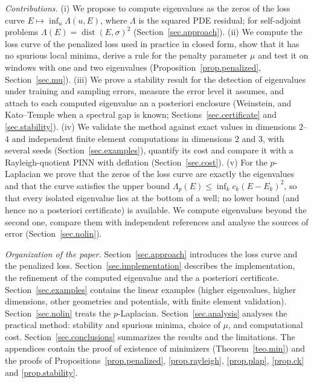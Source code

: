 \documentclass[10pt]{amsart}
\newenvironment{revblock}{\color{blue}}{}
\theoremstyle{definition}
\theoremstyle{remark}
\theoremstyle{plain}
\DeclareMathOperator{\dist}{dist}
\begin{document}
\begin{revblock}
\noindent\emph{Contributions.} (i) We propose to compute eigenvalues as the zeros of the loss curve
$E\mapsto\inf_u\Lambda(u,E)$, where $\Lambda$ is the squared PDE residual; for self-adjoint
problems $\Lambda(E)=\dist(E,\sigma)^2$ (Section~\ref{sec.approach}). (ii) We compute the loss curve
of the penalized loss used in practice in closed form, show that it has no spurious local minima,
derive a rule for the penalty parameter $\mu$ and test it on windows with one and two eigenvalues
(Proposition~\ref{prop.penalized}, Section~\ref{sec.mu}). (iii) We prove a stability result for the
detection of eigenvalues under training and sampling errors, measure the error level it assumes,
and attach to each computed eigenvalue an a posteriori enclosure (Weinstein, and Kato--Temple when
a spectral gap is known;
Sections~\ref{sec.certificate} and \ref{sec.stability}). (iv) We validate the method against exact
values in dimensions $2$--$4$ and independent finite element computations in dimensions $2$ and
$3$, with several seeds
(Section~\ref{sec.examples}), quantify its cost and compare it with a Rayleigh-quotient PINN with
deflation (Section~\ref{sec.cost}). (v) For the $p$-Laplacian we prove that the zeros of the loss
curve are exactly the eigenvalues and that the curve satisfies the upper bound
$\Lambda_p(E)\le\inf_kc_k(E-E_k)^2$, so that every isolated eigenvalue lies at the bottom of a well; no lower
bound (and hence no a posteriori certificate) is available. We compute eigenvalues beyond the second
one, compare them with independent references and analyse the sources of error
(Section~\ref{sec.nolin}).

\noindent\emph{Organization of the paper.} Section~\ref{sec.approach} introduces the loss curve and
the penalized loss. Section~\ref{sec.implementation} describes the implementation, the refinement
of the computed eigenvalue and the a posteriori certificate. Section~\ref{sec.examples} contains
the linear examples (higher eigenvalues, higher dimensions, other geometries and potentials, with
finite element validation). Section~\ref{sec.nolin} treats the $p$-Laplacian. Section~\ref{sec.analysis}
analyses the practical method: stability and spurious minima, choice of $\mu$, and computational
cost. Section~\ref{sec.conclusions} summarizes the results and the limitations. The appendices
contain the proof of existence of minimizers (Theorem~\ref{teo.min}) and the proofs of
Propositions~\ref{prop.penalized}, \ref{prop.rayleigh}, \ref{prop.plap}, \ref{prop.ck} and \ref{prop.stability}.
\end{revblock}
\end{document}
